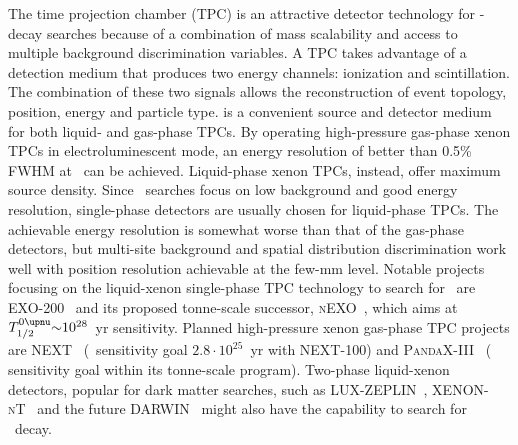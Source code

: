 \begin{description}[wide]
  \item[Time Projection Chambers] The time projection chamber (TPC) is an attractive
    detector technology for \onbb-decay searches because of a combination of mass
    scalability and access to multiple background discrimination variables. A TPC takes
    advantage of a detection medium that produces two energy channels: ionization and
    scintillation. The combination of these two signals allows the reconstruction of event
    topology, position, energy and particle type.  is a convenient source and
    detector medium for both liquid- and gas-phase TPCs. By operating high-pressure
    gas-phase xenon TPCs in electroluminescent mode, an energy resolution of better than
    0.5\% FWHM at \qbb\ can be achieved. Liquid-phase xenon TPCs, instead, offer maximum
    source density. Since \onbb\ searches focus on low background and good energy
    resolution, single-phase detectors are usually chosen for liquid-phase TPCs. The
    achievable energy resolution is somewhat worse than that of the gas-phase detectors,
    but multi-site background and spatial distribution discrimination work well with
    position resolution achievable at the few-mm level. Notable projects focusing on the
    liquid-xenon single-phase TPC technology to search for \onbb\ are
    EXO-200~\cite{Auger2012} and its proposed tonne-scale successor,
    \textsc{nEXO}~\cite{Kharusi2018}, which aims at $\thalfzeroM {\sim}10^{28}$~yr
    sensitivity.  Planned high-pressure xenon gas-phase TPC projects are
    NEXT~\cite{Lopez-March2017} (\thalfzero\ sensitivity goal $2.8 \cdot 10^{25}$~yr with
    NEXT-100) and \textsc{PandaX-III}~\cite{Chen2016} ( sensitivity goal
    within its tonne-scale program). Two-phase liquid-xenon detectors, popular for dark
    matter searches, such as LUX-ZEPLIN~\cite{Akerib2015},
    \textsc{XENON-nT}~\cite{Aprile2017} and the future DARWIN~\cite{Aalbers2016} might
    also have the capability to search for \onbb\ decay.


\end{description}
